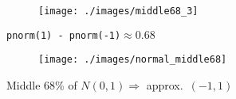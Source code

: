\begin{frame}[t,noframenumbering]
  \vspace{-3em}
\begin{figure}
\texttt{[image: ./images/middle68\_3]}
\end{figure}
\vspace{-1em}
\centering
\texttt{pnorm(1) - pnorm(-1)}$\approx 0.68$
\end{frame}
\begin{frame}[t,noframenumbering]
  \vspace{-3em}
\begin{figure}
\texttt{[image: ./images/normal\_middle68]}
\end{figure}
\vspace{-1em}
\centering
Middle 68\% of $N(0,1) \Rightarrow$ approx.\ $(-1,1)$
\end{frame}

